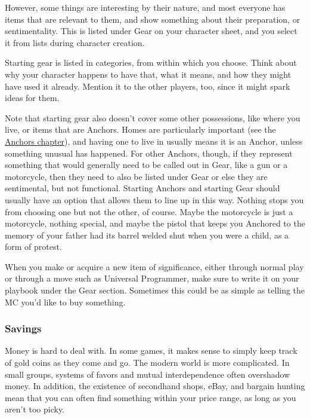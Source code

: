 \documentclass[
]{article}
\begin{document}
However, some things are interesting by their nature, and most everyone
has items that are relevant to them, and show something about their
preparation, or sentimentality. This is listed under Gear on your
character sheet, and you select it from lists during character creation.

Starting gear is listed in categories, from within which you choose.
Think about why your character happens to have that, what it means, and
how they might have used it already. Mention it to the other players,
too, since it might spark ideas for them.

Note that starting gear also doesn't cover some other possessions, like
where you live, or items that are Anchors. Homes are particularly
important (see the \href{AnchorsChapter}{Anchors chapter}), and having
one to live in usually means it is an Anchor, unless something unusual
has happened. For other Anchors, though, if they represent something
that would generally need to be called out in Gear, like a gun or a
motorcycle, then they need to also be listed under Gear or else they are
sentimental, but not functional. Starting Anchors and starting Gear
should usually have an option that allows them to line up in this way.
Nothing stops you from choosing one but not the other, of course. Maybe
the motorcycle is just a motorcycle, nothing special, and maybe the
pistol that keeps you Anchored to the memory of your father had its
barrel welded shut when you were a child, as a form of protest.

When you make or acquire a new item of significance, either through
normal play or through a move such as Universal Programmer, make sure to
write it on your playbook under the Gear section. Sometimes this could
be as simple as telling the MC you'd like to buy something.

\hypertarget{savings}{%
\subsubsection{Savings}\label{savings}}

Money is hard to deal with. In some games, it makes sense to simply keep
track of gold coins as they come and go. The modern world is more
complicated. In small groups, systems of favors and mutual
interdependence often overshadow money. In addition, the existence of
secondhand shops, eBay, and bargain hunting mean that you can often find
something within your price range, as long as you aren't too picky.
\end{document}
